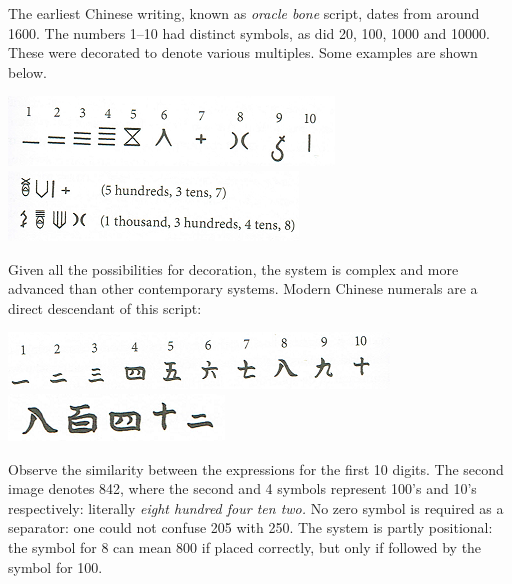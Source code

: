 The earliest Chinese writing, known as \emph{oracle bone} script, dates from around 1600\BC. The numbers 1--10 had distinct symbols, as did 20, 100, 1000 and 10000. These were decorated to denote various multiples. Some examples are shown below. 
\begin{center}
	\includegraphics[angle=1.4]{OracleBones-small.png}
  \includegraphics[angle=1.5]{OracleBones2-small.png}
\end{center}
Given all the possibilities for decoration, the system is complex and more advanced than other contemporary systems. Modern Chinese numerals are a direct descendant of this script:
\begin{center}
  \includegraphics[angle=-1.5]{ModernChinese-small.png}
  \includegraphics[angle=-1.5]{824ModernChinese-small.png}
\end{center}
Observe the similarity between the expressions for the first 10 digits. The second image denotes 842, where the second and 4\th{} symbols represent 100's and 10's respectively: literally \emph{eight hundred four ten two.} No zero symbol is required as a separator: one could not confuse 205 with 250. The system is partly positional: the symbol for 8 can mean 800 if placed correctly, but only if followed by the symbol for 100.
 
  
